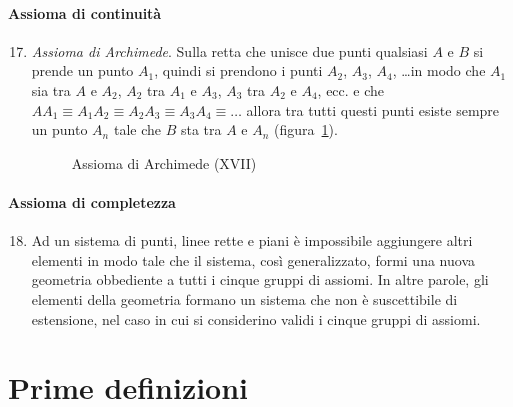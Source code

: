 \paragraph{Assioma di continuità}

\begin{enumerate}[label=\Roman{*}.]
\setcounter{enumi}{16}
\item \emph{Assioma di Archimede}. Sulla retta che unisce due punti 
qualsiasi \(A\) e \(B\) si prende un punto \(A_1\), quindi si prendono i 
punti \(A_2\), \(A_3\), \(A_4\), \ldots in modo che \(A_1\) sia tra \(A\) e 
\(A_2\), \(A_2\) tra \(A_1\) e \(A_3\), \(A_3\) tra \(A_2\) e \(A_4\), ecc. e che  
\(AA_1\equiv A_1A_2\equiv A_2A_3\equiv A_3A_4\equiv\ldots\) allora tra 
tutti questi punti esiste sempre un punto \(A_n\) tale che \(B\) sta tra 
\(A\) e \(A_n\) (figura~\ref{fig:1.11}).

\begin{inaccessibleblock}
 \begin{figure}[bth]
 \centering 
 \caption{Assioma di Archimede (XVII)}\label{fig:1.11}
\end{figure}
\end{inaccessibleblock}
\end{enumerate}

\paragraph{Assioma di completezza}

\begin{enumerate}[label=\Roman{*}.]
\setcounter{enumi}{17}
\item Ad un sistema di punti, linee rette e piani è impossibile 
aggiungere altri elementi in modo tale che il sistema, così 
generalizzato, formi una nuova geometria obbediente a tutti i cinque 
gruppi di assiomi. In altre parole, gli elementi della geometria 
formano un sistema che non è suscettibile di estensione, nel caso in 
cui si considerino validi i cinque gruppi di assiomi.
\end{enumerate}

\vspazio\ovalbox{\risolvii \ref{ese:1.33}, \ref{ese:1.34}, 
\ref{ese:1.36}, \ref{ese:1.37}, \ref{ese:1.38}, \ref{ese:1.39}, 
\ref{ese:1.40}, \ref{ese:1.41}, \ref{ese:1.42}}


\section{Prime definizioni}\label{sect:prime_definizioni}

